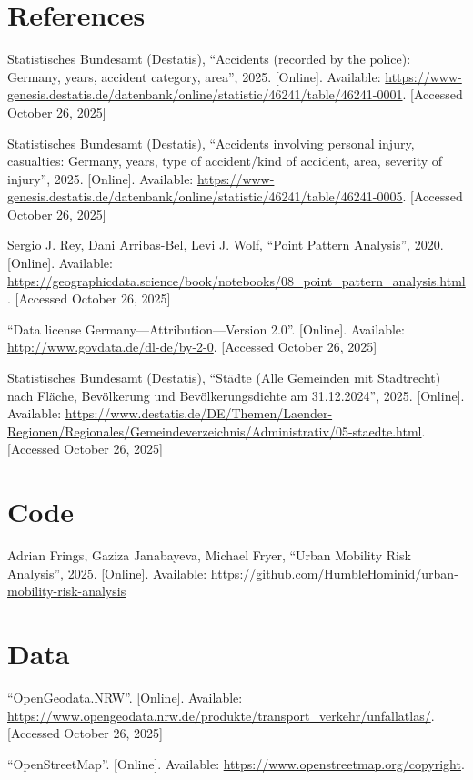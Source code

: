 \documentclass[10pt,a4paper]{article} %
\begin{document}
\section*{References}
\begin{enumerate}[label={[\arabic*]}]
    \item Statistisches Bundesamt (Destatis), ``Accidents (recorded by the police): Germany, years, accident category, area'', 2025. [Online]. Available: \url{https://www-genesis.destatis.de/datenbank/online/statistic/46241/table/46241-0001}. [Accessed October 26, 2025] %
    \item Statistisches Bundesamt (Destatis), ``Accidents involving personal injury, casualties: Germany, years, type of accident/kind of accident, area, severity of injury'', 2025. [Online]. Available: \url{https://www-genesis.destatis.de/datenbank/online/statistic/46241/table/46241-0005}. [Accessed October 26, 2025] %
    \item Sergio J. Rey, Dani Arribas-Bel, Levi J. Wolf, ``Point Pattern Analysis'', 2020. [Online]. Available: \url{https://geographicdata.science/book/notebooks/08_point_pattern_analysis.html}. [Accessed October 26, 2025]
    \item ``Data license Germany---Attribution---Version 2.0''. [Online]. Available: \url{http://www.govdata.de/dl-de/by-2-0}. [Accessed October 26, 2025] %
    \item Statistisches Bundesamt (Destatis), ``Städte (Alle Gemeinden mit Stadtrecht) nach Fläche, Bevölkerung und Bevölkerungsdichte am 31.12.2024'', 2025. [Online]. Available: \url{https://www.destatis.de/DE/Themen/Laender-Regionen/Regionales/Gemeindeverzeichnis/Administrativ/05-staedte.html}. [Accessed October 26, 2025] %
\end{enumerate}

\section*{Code}
\begin{enumerate}[label={[\arabic*]},start=5]
    \item Adrian Frings, Gaziza Janabayeva, Michael Fryer, ``Urban Mobility Risk Analysis'', 2025. [Online]. Available: \url{https://github.com/HumbleHominid/urban-mobility-risk-analysis}
\end{enumerate}

\section*{Data}
\begin{enumerate}[label={[\arabic*]},start=6]
    \item ``OpenGeodata.NRW''. [Online]. Available: \url{https://www.opengeodata.nrw.de/produkte/transport_verkehr/unfallatlas/}. [Accessed October 26, 2025]
    \item ``OpenStreetMap''. [Online]. Available: \url{https://www.openstreetmap.org/copyright}.
\end{enumerate}

\end{document}
